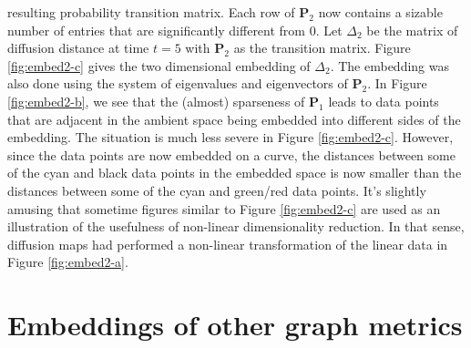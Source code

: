 resulting probability transition matrix. Each row of $\mathbf{P}_2$
now contains a sizable number of entries that are significantly
different from $0$. Let $\Delta_{2}$ be the matrix of diffusion
distance at time $t = 5$ with $\mathbf{P}_2$ as the transition
matrix. Figure \ref{fig:embed2-c} gives the two dimensional embedding
of $\Delta_{2}$. The embedding was also done using the system of
eigenvalues and eigenvectors of $\mathbf{P}_2$. In Figure
\ref{fig:embed2-b}, we see that the (almost) sparseness of
$\mathbf{P}_1$ leads to data points that are adjacent in the ambient
space being embedded into different sides of the embedding. The
situation is much less severe in Figure \ref{fig:embed2-c}. However,
since the data points are now embedded on a curve, the distances
between some of the cyan and black data points in the embedded space
is now smaller than the distances between some of the cyan and green/red
data points. It's slightly amusing that sometime figures similar to
Figure \ref{fig:embed2-c} are used as an illustration of the
usefulness of non-linear dimensionality reduction. In that sense,
diffusion maps had performed a non-linear transformation
of the linear data in Figure \ref{fig:embed2-a}.

\section{Embeddings of other graph metrics}
\label{sec:embedd-other-graph}


